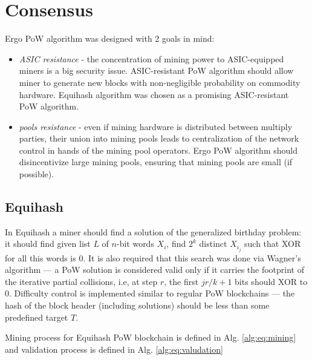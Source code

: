 \section{Consensus}


Ergo PoW algorithm was designed with 2 goals in mind:

\begin{itemize}
    \item{\em ASIC resistance } - the concentration of mining power to ASIC-equipped miners
    is a big security issue.
    ASIC-resistant PoW algorithm should allow miner to generate new blocks with non-negligible
    probability on commodity hardware.
    Equihash algorithm was chosen as a promising ASIC-resistant PoW algorithm.
    \item{\em pools resistance } - even if mining hardware is distributed between multiply parties,
    their union into mining pools leads to centralization of the network control in hands of the mining pool operators.
    Ergo PoW algorithm should disincentivize large mining pools, ensuring that mining pools are small (if possible).
\end{itemize}

\subsection{Equihash}

In Equihash a miner should find a solution of the generalized birthday problem: it should find
given list $L$ of $n$-bit words ${X_i}$, find $2^k$ distinct ${X_{i_j}}$ such that
XOR for all this words is 0. It is also required that this search was done via
Wagner's algorithm --- a PoW solution is considered valid only if it carries the footprint
of the iterative partial collisions, i.e, at step $r$, the first $jr/k+1$ bits should XOR to 0.
Difficulty control is implemented similar to regular PoW blockchains --- the hash of the block header
(including solutions) should be less than some predefined target $T$.

Mining process for Equihash PoW blockchain is defined in Alg. \ref{alg:eq:mining} and validation
process is defined in Alg. \ref{alg:eq:valudation}

